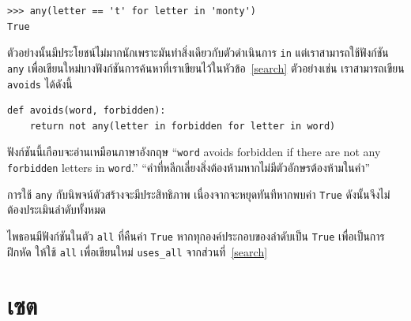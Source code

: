 \begin{verbatim}
>>> any(letter == 't' for letter in 'monty')
True
\end{verbatim}
%
ตัวอย่างนั้นมีประโยชน์ไม่มากนักเพราะมันทำสิ่งเดียวกับตัวดำเนินการ {\tt in}  แต่เราสามารถใช้ฟังก์ชัน  {\tt any} 
เพื่อเขียนใหม่บางฟังก์ชันการค้นหาที่เราเขียนไว้ในหัวข้อ~\ref{search} ตัวอย่างเช่น เราสามารถเขียน {\tt avoids} ได้ดังนี้

\begin{verbatim}
def avoids(word, forbidden):
    return not any(letter in forbidden for letter in word)
\end{verbatim}
%

ฟังก์ชันนี้เกือบจะอ่านเหมือนภาษาอังกฤษ ``{\tt word} avoids forbidden if there are not
any {\tt forbidden} letters in {\tt word}.'' ``คำที่หลีกเลี่ยงสิ่งต้องห้ามหากไม่มีตัวอักษรต้องห้ามในคำ''


การใช้ {\tt any} กับนิพจน์ตัวสร้างจะมีประสิทธิภาพ เนื่องจากจะหยุดทันทีหากพบค่า {\tt True} ดังนั้นจึงไม่ต้องประเมินลำดับทั้งหมด


ไพธอนมีฟังก์ชันในตัว {\tt all} ที่คืนค่า {\tt True} หากทุกองค์ประกอบของลำดับเป็น {\tt True} 
เพื่อเป็นการฝึกหัด ให้ใช้ {\tt all} เพื่อเขียนใหม่ \verb"uses_all" จากส่วนที่~\ref{search}


\section{เซต } %
\label{sets}

